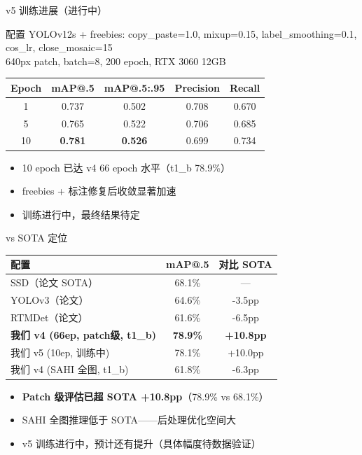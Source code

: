 \documentclass[aspectratio=169, 11pt]{beamer}
\begin{document}
\begin{frame}{v5 训练进展（进行中）}
  \begin{block}{配置}
    YOLOv12s + freebies: copy\_paste=1.0, mixup=0.15, label\_smoothing=0.1, cos\_lr, close\_mosaic=15\\
    640px patch, batch=8, 200 epoch, RTX 3060 12GB
  \end{block}
  \vspace{0.3em}
  \centering
  \begin{tabular}{ccccc}
    \toprule
    Epoch & mAP@.5 & mAP@.5:.95 & Precision & Recall \\
    \midrule
    1 & 0.737 & 0.502 & 0.708 & 0.670 \\
    5 & 0.765 & 0.522 & 0.706 & 0.685 \\
    10 & \textbf{0.781} & \textbf{0.526} & 0.699 & 0.734 \\
    \bottomrule
  \end{tabular}
  \vspace{0.8em}
  \begin{itemize}
    \item 10 epoch 已达 v4 66 epoch 水平（t1\_b 78.9\%）
    \item freebies + 标注修复后收敛显著加速
    \item 训练进行中，最终结果待定
  \end{itemize}
\end{frame}

\begin{frame}{vs SOTA 定位}
  \centering
  \begin{tabular}{lcc}
    \toprule
    配置 & mAP@.5 & 对比 SOTA \\
    \midrule
    SSD（论文 SOTA） & 68.1\% & — \\
    YOLOv3（论文） & 64.6\% & -3.5pp \\
    RTMDet（论文） & 61.6\% & -6.5pp \\
    \midrule
    \textbf{我们 v4 (66ep, patch级, t1\_b)} & \textbf{78.9\%} & \textbf{+10.8pp} \\
    我们 v5 (10ep, 训练中) & 78.1\% & +10.0pp \\
    我们 v4 (SAHI 全图, t1\_b) & 61.8\% & -6.3pp \\
    \bottomrule
  \end{tabular}
  \vspace{0.8em}
  \begin{itemize}
    \item \textbf{Patch 级评估已超 SOTA +10.8pp}（78.9\% vs 68.1\%）
    \item SAHI 全图推理低于 SOTA——后处理优化空间大
    \item v5 训练进行中，预计还有提升（具体幅度待数据验证）
  \end{itemize}
\end{frame}
\end{document}
